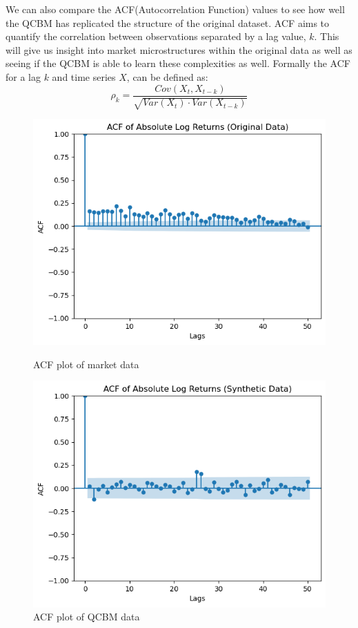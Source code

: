 \documentclass[12pt]{article}
\numberwithin{equation}{section}
\begin{document}
We can also compare the ACF(Autocorrelation Function) values to see how well the 
QCBM has replicated the structure of the original dataset. ACF aims to quantify 
the correlation between observations separated by a lag value, $k$. This will 
give us insight into market microstructures within the original data as well as 
seeing if the QCBM is able to learn these complexities as well. Formally the ACF 
for a lag $k$ and time series $X$, can be defined as:
\begin{equation}
  \rho_k = \frac{Cov(X_t, X_{t-k})}{\sqrt{Var(X_t)\cdot Var(X_{t-k})}}
\end{equation}
\begin{figure}[h!]
    \centering
    \begin{minipage}{0.48\textwidth}
        \centering
        \includegraphics[width=\linewidth]{acfog.png}
        \caption{ACF plot of market data}
        \label{fig:weeklyacfog}
    \end{minipage}
    \hfill
    \begin{minipage}{0.48\textwidth}
        \centering
        \includegraphics[width=\linewidth]{acfqcbm.png}
        \caption{ACF plot of QCBM data}
        \label{fig:weeklyacfqcbm}
    \end{minipage}
\end{figure}
\end{document}
